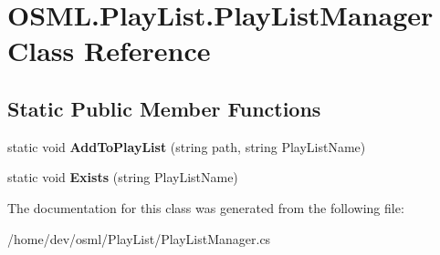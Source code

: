 \hypertarget{classOSML_1_1PlayList_1_1PlayListManager}{}\section{O\+S\+M\+L.\+Play\+List.\+Play\+List\+Manager Class Reference}
\label{classOSML_1_1PlayList_1_1PlayListManager}
\subsection*{Static Public Member Functions}
\begin{DoxyCompactItemize}
\item 
\mbox{\label{classOSML_1_1PlayList_1_1PlayListManager_a01959bacbc22bf53e68caaefeee06fa9}} 
static void {\bfseries Add\+To\+Play\+List} (string path, string Play\+List\+Name)
\item 
\mbox{\label{classOSML_1_1PlayList_1_1PlayListManager_aaa24b9c15eb4e00d6b555a7a96ca8008}} 
static void {\bfseries Exists} (string Play\+List\+Name)
\end{DoxyCompactItemize}


The documentation for this class was generated from the following file\+:\begin{DoxyCompactItemize}
\item 
/home/dev/osml/\+Play\+List/Play\+List\+Manager.\+cs\end{DoxyCompactItemize}
